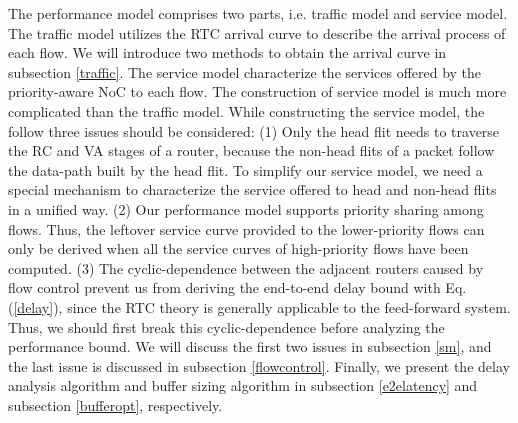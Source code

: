 \documentclass[preprint]{elsarticle}
\begin{document}
The performance model comprises two parts, i.e. traffic model and service model. The traffic model utilizes the RTC arrival curve to describe the arrival process of each flow. We will introduce two methods to obtain the arrival curve in subsection \ref{traffic}. The service model characterize the services offered by the priority-aware NoC to each flow. The construction of service model is much more complicated than the traffic model. While constructing the service model, the follow three issues should be considered: (1) Only the head flit needs to traverse the RC and VA stages of a router, because the non-head flits of a packet follow the data-path built by the head flit. To simplify our service model, we need a special mechanism to characterize the service offered to head and non-head flits in a unified way. (2) Our performance model supports priority sharing among flows. Thus, the leftover service curve provided to the lower-priority flows can only be derived when all the service curves of high-priority flows have been computed. (3) The cyclic-dependence between the adjacent routers caused by flow control prevent us from deriving the end-to-end delay bound with Eq.(\ref{delay}), since the RTC theory is generally applicable to the feed-forward system. Thus, we should first break this cyclic-dependence before analyzing the performance bound. We will discuss the first two issues in subsection \ref{sm}, and the last issue is discussed in subsection \ref{flowcontrol}. Finally, we present the delay analysis algorithm and buffer sizing algorithm in subsection \ref{e2elatency} and subsection \ref{bufferopt}, respectively.
\end{document}
